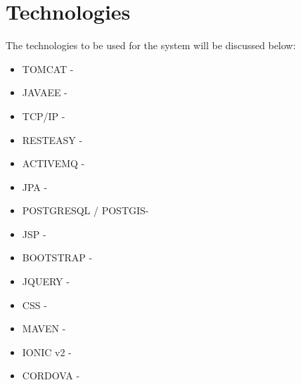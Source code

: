 
\section{Technologies}
The technologies to be used for the system will be discussed below:
\begin{itemize}
	\item TOMCAT - 
	
	\item JAVAEE - 
	
	\item TCP/IP - 
	
	\item RESTEASY - 
	
	\item ACTIVEMQ - 
	
	\item JPA -
	
	\item POSTGRESQL / POSTGIS- 
	
	
	
	\item JSP - 
	
	\item BOOTSTRAP - 
	
	\item JQUERY - 
	
	\item CSS - 
	
	\item MAVEN - 
	
	
	
	\item IONIC v2 - 
	
	\item CORDOVA - 
	
	
	
\end{itemize}
